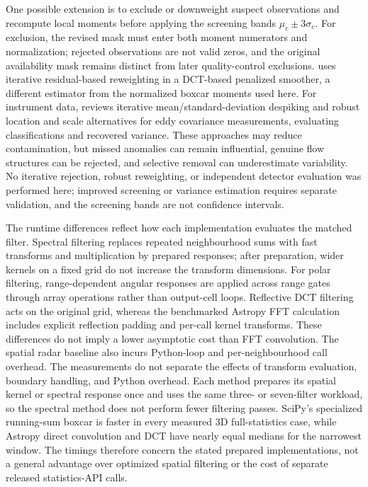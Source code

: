 \documentclass[a4paper,fleqn]{cas-sc}
\begin{document}
One possible extension is to exclude or downweight suspect observations and recompute local moments before applying the screening bands $\mu_c\pm3\sigma_c$. For exclusion, the revised mask must enter both moment numerators and normalization; rejected observations are not valid zeros, and the original availability mask remains distinct from later quality-control exclusions. \citet{Garcia2010} uses iterative residual-based reweighting in a DCT-based penalized smoother, a different estimator from the normalized boxcar moments used here. For instrument data, \citet{Vitale2021} reviews iterative mean/standard-deviation despiking and robust location and scale alternatives for eddy covariance measurements, evaluating classifications and recovered variance. These approaches may reduce contamination, but missed anomalies can remain influential, genuine flow structures can be rejected, and selective removal can underestimate variability. No iterative rejection, robust reweighting, or independent detector evaluation was performed here; improved screening or variance estimation requires separate validation, and the screening bands are not confidence intervals.

The runtime differences reflect how each implementation evaluates the matched filter. Spectral filtering replaces repeated neighbourhood sums with fast transforms and multiplication by prepared responses; after preparation, wider kernels on a fixed grid do not increase the transform dimensions. For polar filtering, range-dependent angular responses are applied across range gates through array operations rather than output-cell loops. Reflective DCT filtering acts on the original grid, whereas the benchmarked Astropy FFT calculation includes explicit reflection padding and per-call kernel transforms. These differences do not imply a lower asymptotic cost than FFT convolution. The spatial radar baseline also incurs Python-loop and per-neighbourhood call overhead. The measurements do not separate the effects of transform evaluation, boundary handling, and Python overhead. Each method prepares its spatial kernel or spectral response once and uses the same three- or seven-filter workload, so the spectral method does not perform fewer filtering passes. SciPy's specialized running-sum boxcar is faster in every measured 3D full-statistics case, while Astropy direct convolution and DCT have nearly equal medians for the narrowest window. The timings therefore concern the stated prepared implementations, not a general advantage over optimized spatial filtering or the cost of separate released statistics-API calls.
\end{document}
